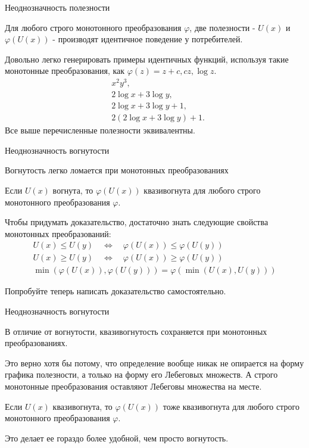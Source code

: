 \documentclass{beamer}
\begin{document}
\begin{frame}{Неоднозначность полезности}

Для любого строго монотонного преобразования $\varphi$, две полезности - $U(x)$ и $\varphi(U(x))$ - производят идентичное поведение у потребителей.  

Довольно легко генерировать примеры идентичных функций, используя такие монотонные преобразования, как $\varphi(z) = z + c, cz , \log z$.
\begin{align*}
& x^2y^3,\\
& 2\log x + 3\log y,\\
& 2\log x + 3\log y + 1,\\
& 2(2\log x + 3\log y) + 1.
\end{align*}
Все выше перечисленные полезности эквивалентны.
\end{frame}

\begin{frame}{Неоднозначность вогнутости}

Вогнутость легко ломается при монотонных преобразованиях

\begin{lemma}
Если $U(x)$ вогнута, то $\varphi(U(x))$ квазивогнута для любого строго монотонного преобразования $\varphi$. 
\end{lemma}

Чтобы придумать доказательство, достаточно знать следующие свойства монотонных преобразований:
 \begin{align*}
U(x) \leqslant U(y) \quad \Leftrightarrow \quad \varphi(U(x)) \leqslant \varphi(U(y))\\
U(x) \geqslant U(y) \quad \Leftrightarrow \quad \varphi(U(x)) \geqslant \varphi(U(y))\\
\min(\varphi(U(x)), \varphi(U(y))) = \varphi(\min(U(x),U(y)))
\end{align*}

Попробуйте теперь написать доказательство самостоятельно.

\end{frame}

\begin{frame}{Неоднозначность вогнутости}

В отличие от вогнутости, квазивогнутость сохраняется при монотонных преобразованиях.

Это верно хотя бы потому, что определение вообще никак не опирается на форму графика полезности, а только на форму его Лебеговых множеств. А \alert{строго монотонные преобразования оставляют Лебеговы множества на месте}.

\begin{lemma}
Если $U(x)$ квазивогнута, то $\varphi(U(x))$ тоже квазивогнута для любого строго монотонного преобразования $\varphi$. 
\end{lemma}

Это делает ее гораздо более удобной, чем просто вогнутость.

\end{frame}
\end{document}

